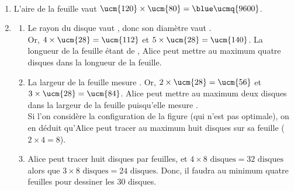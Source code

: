 {\begin{corrige}
\ \\ [-5mm]
   \begin{enumerate}
      \item L'aire de la feuille vaut $\ucm{120}\times\ucm{80} ={\blue \ucmq{9600}}$.
      \item 
         \begin{enumerate}
            \item Le rayon du disque vaut , donc son diamètre vaut . \\
               Or, $4\times\ucm{28} =\ucm{112}$ et $5\times\ucm{28} =\ucm{140}$. La longueur de la feuille étant de , {\blue Alice peut mettre au maximum quatre disques dans la longueur de la feuille}.
            \item La largeur de la feuille mesure . Or, $2\times\ucm{28} =\ucm{56}$ et $3\times\ucm{28} =\ucm{84}$. Alice peut mettre au maximum deux disques dans la largeur de la feuille puisqu'elle mesure . \\
               Si l'on considère la configuration de la figure (qui n'est pas optimale), on en déduit qu'{\blue Alice peut tracer au maximum huit disques sur sa feuille} ($2\times4 =8$).
            \item Alice peut tracer huit disques par feuilles, et $4\times8\text{ disques} =32\text{ disques}$ alors que $3\times8\text{ disques} =24\text{ disques}$. Donc, {\blue il faudra au minimum quatre feuilles pour dessiner les 30 disques}.
         \end{enumerate}
   \end{enumerate}
   
\Coupe
 

\end{corrige}}
